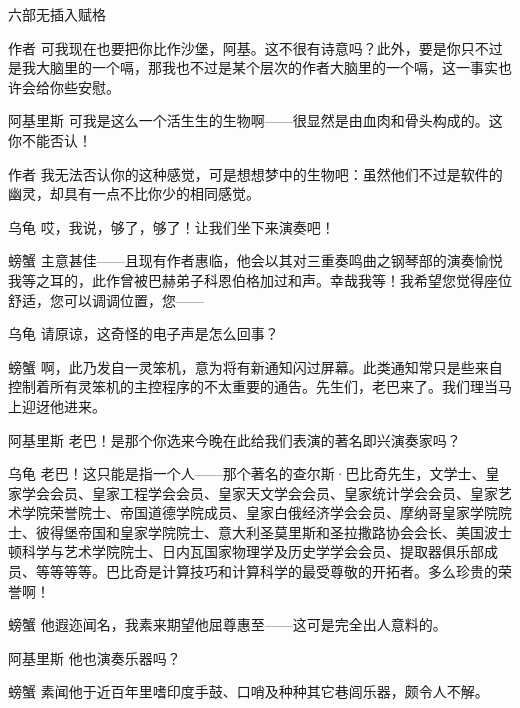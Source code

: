 \begin{dialog}{六部无插入赋格}
\begin{dialogue}
\item[作者]可我现在也要把你比作沙堡，阿基。这不很有诗意吗？此外，要是你只不过是我大脑里的一个嗝，那我也不过是某个层次的作者大脑里的一个嗝，这一事实也许会给你些安慰。

\item[阿基里斯]可我是这么一个活生生的生物啊——很显然是由血肉和骨头构成的。这你不能否认！

\item[作者]我无法否认你的这种感觉，可是想想梦中的生物吧：虽然他们不过是软件的幽灵，却具有一点不比你少的相同感觉。

\item[乌龟]哎，我说，够了，够了！让我们坐下来演奏吧！

\item[螃蟹]主意甚佳——且现有作者惠临，他会以其对三重奏鸣曲之钢琴部的演奏愉悦我等之耳的，此作曾被巴赫弟子科恩伯格加过和声。幸哉我等！我希望您觉得座位舒适，您可以调调位置，您——

\item[乌龟]请原谅，这奇怪的电子声是怎么回事？

\item[螃蟹]啊，此乃发自一灵笨机，意为将有新通知闪过屏幕。此类通知常只是些来自控制着所有灵笨机的主控程序的不太重要的通告。先生们，老巴来了。我们理当马上迎迓他进来。

\item[阿基里斯]老巴！是那个你选来今晚在此给我们表演的著名即兴演奏家吗？

\item[乌龟]老巴！这只能是指一个人——那个著名的查尔斯·巴比奇先生，文学士、皇家学会会员、皇家工程学会会员、皇家天文学会会员、皇家统计学会会员、皇家艺术学院荣誉院士、帝国道德学院成员、皇家白俄经济学会会员、摩纳哥皇家学院院士、彼得堡帝国和皇家学院院士、意大利圣莫里斯和圣拉撒路协会会长、美国波士顿科学与艺术学院院士、日内瓦国家物理学及历史学学会会员、提取器俱乐部成员、等等等等。巴比奇是计算技巧和计算科学的最受尊敬的开拓者。多么珍贵的荣誉啊！

\item[螃蟹]他遐迩闻名，我素来期望他屈尊惠至——这可是完全出人意料的。

\item[阿基里斯]他也演奏乐器吗？

\item[螃蟹]素闻他于近百年里嗜印度手鼓、口哨及种种其它巷闾乐器，颇令人不解。


\end{dialogue}
\end{dialog}
